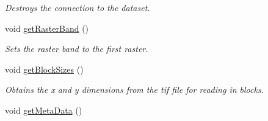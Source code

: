 \begin{DoxyCompactItemize}
\begin{DoxyCompactList}\small\item\em Destroys the connection to the dataset. \end{DoxyCompactList}\item 
void \hyperlink{class_map_ade2338d7a8d598c343208b633f8a3a93}{get\+Raster\+Band} ()\hypertarget{class_map_ade2338d7a8d598c343208b633f8a3a93}{}\label{class_map_ade2338d7a8d598c343208b633f8a3a93}

\begin{DoxyCompactList}\small\item\em Sets the raster band to the first raster. \end{DoxyCompactList}\item 
void \hyperlink{class_map_a4e441dcda33d78bef193b1ad1265b5e8}{get\+Block\+Sizes} ()\hypertarget{class_map_a4e441dcda33d78bef193b1ad1265b5e8}{}\label{class_map_a4e441dcda33d78bef193b1ad1265b5e8}

\begin{DoxyCompactList}\small\item\em Obtains the x and y dimensions from the tif file for reading in blocks. \end{DoxyCompactList}\item 
void \hyperlink{class_map_a180284cfba3442eb3d62fc41d0d8f546}{get\+Meta\+Data} ()\hypertarget{class_map_a180284cfba3442eb3d62fc41d0d8f546}{}\label{class_map_a180284cfba3442eb3d62fc41d0d8f546}


\end{DoxyCompactItemize}
